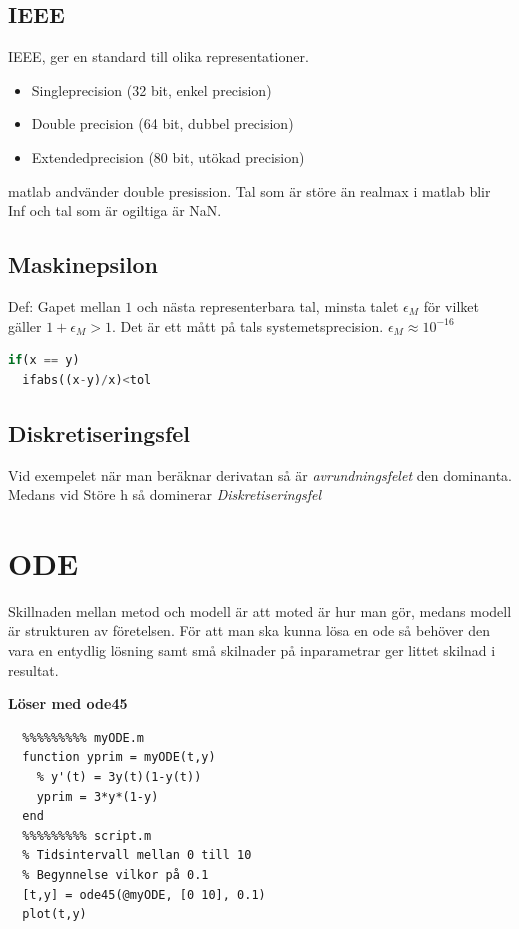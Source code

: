 \subsection{IEEE}
IEEE, ger en standard till olika representationer.
\begin{itemize}
  \item Singleprecision (32 bit, enkel precision)
  \item Double precision (64 bit, dubbel precision)
  \item Extendedprecision (80 bit, utökad precision)
\end{itemize}
matlab andvänder double presission.
Tal som är störe än realmax i matlab blir Inf och tal som är ogiltiga är NaN.

\subsection{Maskinepsilon}
Def: Gapet mellan $1$ och nästa representerbara tal, minsta talet $\epsilon_M$ för vilket
gäller $1+\epsilon_M > 1$. Det är ett mått på tals systemetsprecision. $\epsilon_M \approx 10^{-16}$

\begin{lstlisting}[language=Python]
  if(x == y)
  ifabs((x-y)/x)<tol
\end{lstlisting}

\subsection{Diskretiseringsfel}
Vid exempelet när man beräknar derivatan så är \textit{avrundningsfelet} den dominanta. Medans
vid Störe h så dominerar \textit{Diskretiseringsfel}

\newpage
\section{ODE}
Skillnaden mellan metod och modell är att moted är hur man gör, 
medans modell är strukturen av företelsen.
För att man ska kunna lösa en ode så behöver den vara en entydlig 
lösning samt små skilnader på inparametrar ger littet skilnad i resultat.

\textbf{Löser med ode45}
\begin{verbatim}
  %%%%%%%%% myODE.m
  function yprim = myODE(t,y)
    % y'(t) = 3y(t)(1-y(t))
    yprim = 3*y*(1-y)
  end
  %%%%%%%%% script.m
  % Tidsintervall mellan 0 till 10
  % Begynnelse vilkor på 0.1
  [t,y] = ode45(@myODE, [0 10], 0.1)
  plot(t,y)
\end{verbatim}

